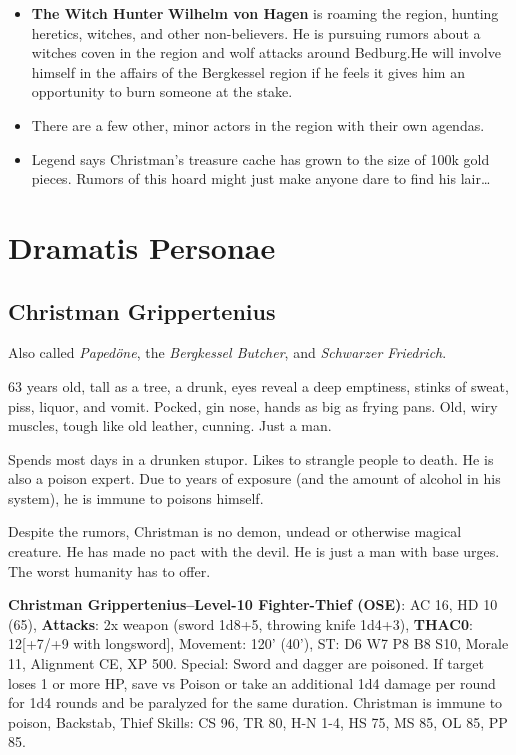\documentclass[
]{book}
\begin{document}
\begin{itemize}
\item
  \textbf{The Witch Hunter} \textbf{Wilhelm von Hagen} is roaming the region, hunting heretics, witches, and other non-believers. He is pursuing rumors about a witches coven in the region and wolf attacks around Bedburg.He will involve himself in the affairs of the Bergkessel region if he feels it gives him an opportunity to burn someone at the stake.
\item
  There are a few other, minor actors in the region with their own agendas.
\item
  Legend says Christman's treasure cache has grown to the size of 100k gold pieces. Rumors of this hoard might just make anyone dare to find his lair\ldots{}
\end{itemize}

\section{Dramatis Personae}\label{dramatis-personae}

\subsection{Christman Grippertenius}\label{christman-grippertenius}

Also called \emph{Papedöne}, the \emph{Bergkessel Butcher}, and \emph{Schwarzer Friedrich}.

63 years old, tall as a tree, a drunk, eyes reveal a deep emptiness, stinks of sweat, piss, liquor, and vomit. Pocked, gin nose, hands as big as frying pans. Old, wiry muscles, tough like old leather, cunning. Just a man.

Spends most days in a drunken stupor. Likes to strangle people to death. He is also a poison expert. Due to years of exposure (and the amount of alcohol in his system), he is immune to poisons himself.

Despite the rumors, Christman is no demon, undead or otherwise magical creature. He has made no pact with the devil. He is just a man with base urges. The worst humanity has to offer.

\textbf{Christman Grippertenius--Level-10 Fighter-Thief (OSE)}: AC 16, HD 10 (65), \textbf{Attacks}: 2x weapon (sword 1d8+5, throwing knife 1d4+3), \textbf{THAC0}: 12{[}+7/+9 with longsword{]}, Movement: 120' (40'), ST: D6 W7 P8 B8 S10, Morale 11, Alignment CE, XP 500. Special: Sword and dagger are poisoned. If target loses 1 or more HP, save vs Poison or take an additional 1d4 damage per round for 1d4 rounds and be paralyzed for the same duration. Christman is immune to poison, Backstab, Thief Skills: CS 96, TR 80, H-N 1-4, HS 75, MS 85, OL 85, PP 85.
\end{document}
